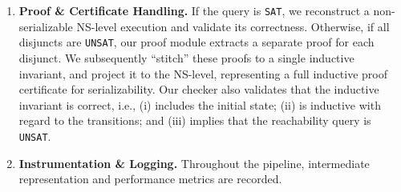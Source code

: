 \begin{enumerate}
	
	\item \textbf{Proof \& Certificate Handling.} If the query is \texttt{SAT}, we reconstruct a non-serializable NS-level execution and validate its correctness. Otherwise, if all disjuncts are \texttt{UNSAT}, our proof module extracts a separate proof for each disjunct. We subsequently ``stitch'' these proofs to a single inductive invariant, and project it to the NS-level, representing a full inductive proof certificate for serializability. Our checker also validates that the inductive invariant is correct, i.e., (i) includes the initial state; (ii) is inductive with regard to the transitions; and (iii) implies that the reachability query is \texttt{UNSAT}.
	
	
	\item \textbf{Instrumentation \& Logging.} Throughout the pipeline, intermediate representation and performance metrics 
are recorded. 
	
	
\end{enumerate}





